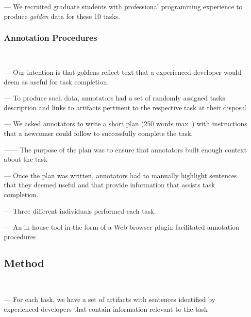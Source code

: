 --- We recruited  graduate students with professional programming experience to produce \textit{golden} data for these 10 tasks. \vspace{3mm}


\subsubsection{Annotation Procedures}
\textcolor{white}{force ident} %

--- Our intention is that goldens reflect text that a experienced developer would deem as useful for task completion. \vspace{3mm}

--- To produce such data, annotators had a set of randomly assigned tasks description and links to artifacts 
pertinent to the respective task at their disposal \vspace{3mm}

--- We asked annotators to write a short plan (250 words max~\cite{Rastkar2010}) with instructions that a newcomer could follow to successfully complete the task. 

------ The purpose of the plan was to ensure that annotators built enough context about the task \vspace{3mm}

--- Once the plan was written,  annotators had to manually highlight sentences that they deemed useful and that provide information that assists task completion. \vspace{3mm}

--- Three different individuals performed each task. \vspace{3mm}

--- An in-house tool in the form of a Web browser plugin facilitated annotation procedures



\subsection{Method}
\textcolor{white}{force ident} %


--- For each task, we have a set of artifacts with sentences identified by experienced developers that contain information relevant to the task \vspace{3mm}

